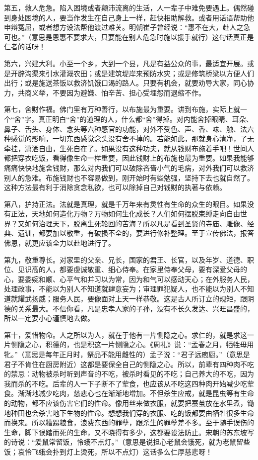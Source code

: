 \documentclass[12pt,UTF8]{ctexbook}
\begin{document}
第五，救人危急。陷入困境或者颠沛流离的生活，人一辈子中难免要遇上。偶然碰到身处困境的人，要当作发生在自己身上一样，赶快相助解救。或者用话语帮助他申辩冤屈，或者想方设法帮他渡过难关。明朝崔子曾经说：“惠不在大，赴人之急可也。”（意思是恩惠不要求大，只要能在别人危急时施以援手就行）这句话真正是仁者的话呀！

第六，兴建大利。小至一个乡，大到一个县，凡是有益公众的事，最适宜开展。或是开辟沟渠来引水灌溉农田；或是建筑堤岸来预防水灾；或是修筑桥梁以方便人们出行；或是施送茶饭以救济饥饿口渴的路人。只要有机会，就要劝导大家，同心协力，共商义举，不要因为避嫌、怕辛苦、担心受埋怨而退缩不作。

第七，舍财作福。佛门里有万种善行，以布施最为重要。讲到布施，实际上就一个“舍”字。真正明白“舍”的道理的人，什么都“舍”得掉。对内能舍掉眼睛、耳朵、鼻子、舌头、身体、念头等六种感官的功能，对外不受色、声、香、味、触、法六种感觉的影响，一切东西感觉念头没有舍不掉的。若能如此，那就身心清净，了无牵挂，潇洒自由，生死自在了。如果没有这种功夫，就从钱财布施着手吧！世间人都把穿衣吃饭，看得像生命一样重要，因此钱财上的布施也最为重要。如果我能够痛痛快快地施舍钱财，那么对内我们可以破除吝啬小气的毛病，对外我们可以救济别人的急难。布施钱财也不容易做到，刚开始时有些勉强，坚持下去也就自然了。这种方法最有利于消除贪念私欲，也可以除掉自己对钱财的执著与依赖。

第八，护持正法。法就是真理，就是千万年来有灵性有生命的众生的眼目。如果没有正法，天地如何造化万物？万物如何生化成长？人们如何摆脱束缚走向自由世界？又如何治理天下，脱离生死轮回的苦海？所以凡是看到圣贤的寺庙、雕像、经典、遗训，都要加以敬重，有破损不全的，要进行修补整理。至于宣传佛法，报答佛恩，就更应该全力以赴地进行了。

第九，敬重尊长。对家里的父亲、兄长，国家的君王、长官，以及年岁、道德、职位、见识高的人，都要虔诚敬重、细心侍奉。在家里侍奉父母，要有深爱父母的心，要委婉和顺、心平气和并习以为常，因为和气可以感动天心；在外服务人民，处理政事，不能以为别人不知道就肆意妄为；审理罪犯疑人，也不能以为别人不知道就耀武扬威；服务人民，要像面对上天一样恭敬。这是古人所订立的规矩，跟阴德的关系最大。不信你看，凡是忠孝人家的子孙，没有不长久发达、兴旺昌盛的，所以一定要小心谨慎地去做。

第十，爱惜物命。人之所以为人，就在于他有一片恻隐之心。求仁的，就是求这一片恻隐之心，积德的，也是积这一片恻隐之心。《周礼》说：“孟春之月，牺牲毋用牝。”（意思是每年正月时，祭品不能用雌性的）孟子说：“君子远庖厨。”（意思是君子不肯住在厨房附近）这都是要保全自己的恻隐之心。所以，前辈有四种肉不吃的禁忌：动物被杀时听到声音的不吃，被杀时看见的不吃；自己养大的不吃，因为我而杀的不吃。后辈的人一下子断不了荤食，也应该从不吃这四种肉开始减少吃荤食。渐渐地减少吃肉，慈悲心也在渐渐地增加。不但杀生应戒，就是昆虫等有生命的动物，都不应该伤害它们的性命。像用丝来做衣服，就要把蚕茧放在水里煮，锄地种田也会杀害地下生物的性命。想想我们穿的衣服、吃的饭都要由牺牲很多生命而换来。所以糟蹋粮食，浪费东西的罪孽，跟杀生的罪孽差不多。至于随手误伤的生命，脚下误踏而死的生命，又不晓得有多少，这都要设法防止。宋朝的苏东坡写的诗说：“爱鼠常留饭，怜蛾不点灯。”（意思是说担心老鼠会饿死，就为老鼠留些饭；哀怜飞蛾会扑到灯上烫死，所以不点灯）这话多么仁厚慈悲呀！
\end{document}
